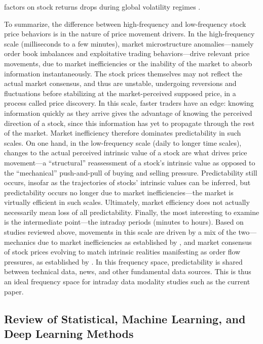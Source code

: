 \documentclass[stu,floatsintext]{apa7}
\begin{document}
factors on stock returns drops during global volatility regimes \parencite{catao2010volatility}.

To summarize, the difference between high-frequency and low-frequency stock price behaviors is in the nature of price movement drivers. In the high-frequency scale (milliseconds to a few minutes), market microstructure anomalies—namely order book imbalances and exploitative trading behaviors—drive relevant price movements, due to market inefficiencies or the inability of the market to absorb information instantaneously. The stock prices themselves may not reflect the actual market consensus, and thus are unstable, undergoing reversions and fluctuations before stabilizing at the market-perceived supposed price, in a process called price discovery. In this scale, faster traders have an edge: knowing information quickly as they arrive gives the advantage of knowing the perceived direction of a stock, since this information has yet to propagate through the rest of the market. Market inefficiency therefore dominates predictability in such scales. On one hand, in the low-frequency scale (daily to longer time scales), changes to the actual perceived intrinsic value of a stock are what drives price movement—a “structural” reassessment of a stock’s intrinsic value as opposed to the “mechanical” push-and-pull of buying and selling pressure. Predictability still occurs, insofar as the trajectories of stocks’ intrinsic values can be inferred, but predictability occurs no longer due to market inefficiencies—the market is virtually efficient in such scales. Ultimately, market efficiency does not actually necessarily mean loss of all predictability. Finally, the most interesting to examine is the intermediate point—the intraday periods (minutes to hours). Based on studies reviewed above, movements in this scale are driven by a mix of the two—mechanics due to market inefficiencies as established by \textcite{du2017what}, and market consensus of stock prices evolving to match intrinsic realities manifesting as order flow pressures, as established by \textcite{moberg2007stock}. In this frequency space, predictability is shared between technical data, news, and other fundamental data sources. This is thus an ideal frequency space for intraday data modality studies such as the current paper.

\subsection{Review of Statistical, Machine Learning, and Deep Learning Methods}
\end{document}
